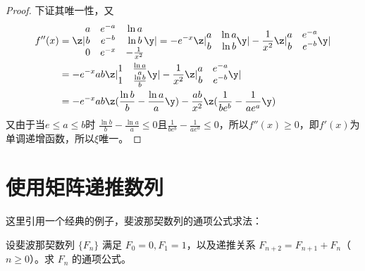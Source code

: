 \begin{proof}
下证其唯一性，又
\begin{align*}
f''(x)&=\z|\begin{matrix} 
                       a & e^{-a}    & \ln a \\
                       b & e^{-b}    & \ln b \\
                       0 & e^{-x}    & -\frac{1}{x^2} \end{matrix}  \y|
=- e^{-x} \z|\begin{matrix} 
                       a & \ln a    \\
                       b & \ln b    \\ \end{matrix}  \y| 
 - \frac{1}{x^2}\z|\begin{matrix} 
                       a & e^{-a}    \\
                       b & e^{-b}    \\ \end{matrix}  \y| \\
&=- e^{-x}ab \z|\begin{matrix} 
                       1 & \frac{\ln a}{a}\\
                       1 & \frac{\ln b}{b}    \\ \end{matrix}  \y| 
 - \frac{1}{x^2}\z|\begin{matrix} 
                       a & e^{-a}    \\
                       b & e^{-b}    \\ \end{matrix}  \y|\\
&=- e^{-x}ab \z(\frac{\ln b}{b} - \frac{\ln a}{a}\y) 
  - \frac{ab}{x^2} \z(\frac{1}{be^b} - \frac{1}{ae^a}\y) \\
\end{align*}
又由于当$e\le a\le b $时 $\frac{\ln b}{b} - \frac{\ln a}{a}\le 0$且$\frac{1}{be^b} - \frac{1}{ae^a}\le 0$，所以$f''(x)\ge0$，即$f'(x)$为单调递增函数，所以$\xi$唯一。
\end{proof}

\section{使用矩阵递推数列}
这里引用一个经典的例子，斐波那契数列的通项公式求法：
\begin{example}
设斐波那契数列 \(\{F_n\}\) 满足 \(F_0=0, F_1=1\)，以及递推关系 \(F_{n+2}=F_{n+1}+F_n\)（\(n\ge 0\)）。求 \(F_n\) 的通项公式。
\end{example}

